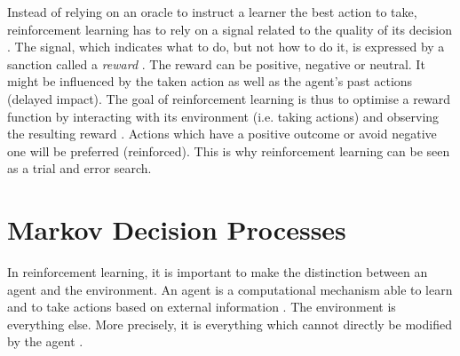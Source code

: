 Instead of relying on an oracle to instruct a learner the best action to take, reinforcement learning has to rely on a signal related to the quality of its decision \cite[p.~25]{sutton_reinforcement_1998}. The signal, which indicates what to do, but not how to do it, is expressed by a sanction called a \textit{reward} \cite[p.~18]{yves_glorennec_reinforcement_2001}. The reward can be positive, negative or neutral. It might be influenced by the taken action as well as the agent's past actions (delayed impact). The goal of reinforcement learning is thus to optimise a reward function by interacting with its environment (i.e. taking actions) and observing the resulting reward \cite{g._barto_1_2008}. Actions which have a positive outcome or avoid negative one will be preferred (reinforced). This is why reinforcement learning can be seen as a trial and error search.


 


\section{Markov Decision Processes}

In reinforcement learning, it is important to make the distinction between an agent and the environment. An agent is a computational mechanism able to learn and to take actions based on external information \cite{panait_cooperative_2005}. The environment is everything else. More precisely, it is everything which cannot directly be modified by the agent \cite[p.~50]{sutton_reinforcement_1998}.

